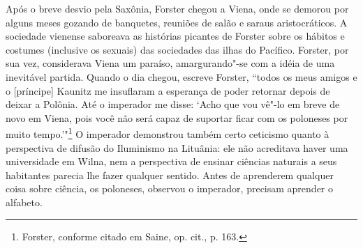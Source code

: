%

Após o breve desvio pela Saxônia, Forster chegou a Viena, onde se
demorou por alguns meses gozando de banquetes, reuniões de salão e
saraus aristocráticos. A sociedade vienense saboreava as histórias
picantes de Forster sobre os hábitos e costumes (inclusive os sexuais)
das sociedades das ilhas do Pacífico. Forster, por sua vez, considerava
Viena um paraíso, amargurando"-se com a idéia de uma inevitável partida.
Quando o dia chegou, escreve Forster, ``todos os meus amigos e o
{[}príncipe{]} Kaunitz me insuflaram a esperança de poder retornar
depois de deixar a Polônia. Até o imperador me disse: `Acho que vou
vê"-lo em breve de novo em Viena, pois você não será capaz de suportar
ficar com os poloneses por muito tempo.'"\footnote{Forster, conforme
  citado em Saine, op. cit., p. 163.} O imperador demonstrou também
certo ceticismo quanto à perspectiva de difusão do Iluminismo na
Lituânia: ele não acreditava haver uma universidade em Wilna, nem a
perspectiva de ensinar ciências naturais a seus habitantes parecia lhe
fazer qualquer sentido. Antes de aprenderem qualquer coisa sobre
ciência, os poloneses, observou o imperador, precisam aprender o
alfabeto.

\asterisc

%

